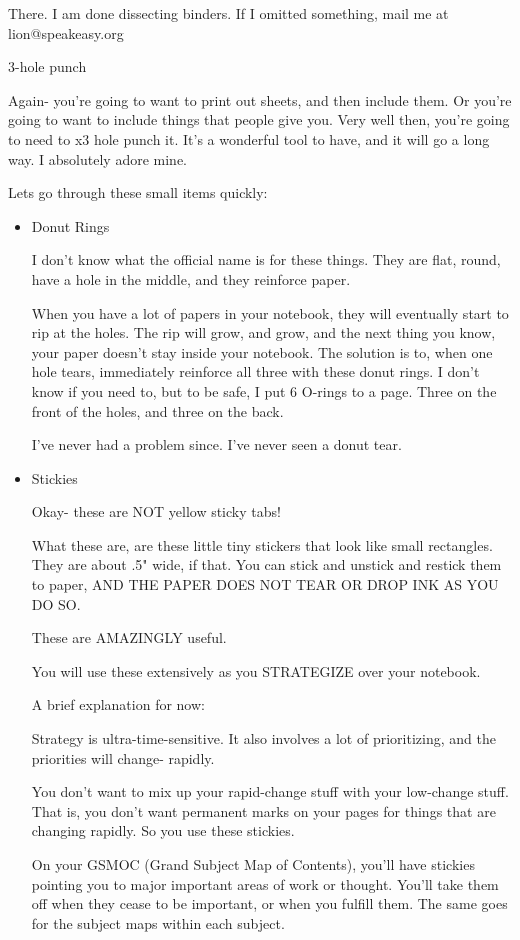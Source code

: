 \documentclass[oneside]{book}
\begin{document}
There. I am done dissecting binders. If I omitted something, mail me
at lion@speakeasy.org

3-hole punch

Again- you're going to want to print out sheets, and then include
them. Or you're going to want to include things that people give
you. Very well then, you're going to need to x3 hole punch it. It's a
wonderful tool to have, and it will go a long way. I absolutely adore
mine.

Lets go through these small items quickly:

\begin{itemize}
\item Donut Rings

I don't know what the official name is for these things. They are
flat, round, have a hole in the middle, and they reinforce paper.

When you have a lot of papers in your notebook, they will eventually
start to rip at the holes. The rip will grow, and grow, and the next
thing you know, your paper doesn't stay inside your notebook. The
solution is to, when one hole tears, immediately reinforce all three
with these donut rings. I don't know if you need to, but to be safe, I
put 6 O-rings to a page. Three on the front of the holes, and three on
the back.

I've never had a problem since. I've never seen a donut tear.

\item Stickies

Okay- these are NOT yellow sticky tabs!

What these are, are these little tiny stickers that look like small
rectangles. They are about .5" wide, if that. You can stick and
unstick and restick them to paper, AND THE PAPER DOES NOT TEAR OR DROP
INK AS YOU DO SO.

These are AMAZINGLY useful.

You will use these extensively as you STRATEGIZE over your notebook.

A brief explanation for now:

Strategy is ultra-time-sensitive. It also involves a lot of
prioritizing, and the priorities will change- rapidly.

You don't want to mix up your rapid-change stuff with your low-change
stuff. That is, you don't want permanent marks on your pages for
things that are changing rapidly. So you use these stickies.

On your GSMOC (Grand Subject Map of Contents), you'll have stickies
pointing you to major important areas of work or thought. You'll take
them off when they cease to be important, or when you fulfill
them. The same goes for the subject maps within each subject.


\end{itemize}
\end{document}
